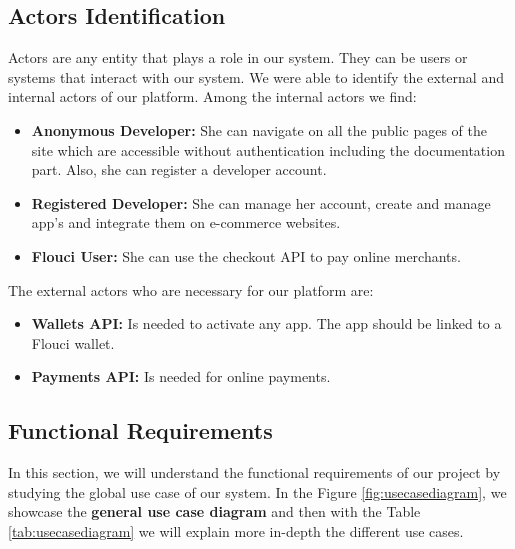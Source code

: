 \begin{spacing}{1.2}
\subsection{Actors Identification}
Actors are any entity that plays a role in our system. They can be users or systems that interact with our system. We were able to identify the external and internal actors of our platform.
\newline
Among the internal actors we find:
\begin{itemize}
  \item \textbf{Anonymous Developer:} She can navigate on all the public pages of the site which are
accessible without authentication including the documentation part. Also, she can register a developer account.
  \item \textbf{Registered Developer:} She can manage her account, create and manage app's and integrate them on e-commerce websites.
  \item \textbf{Flouci User:}  She can use the checkout API to pay online merchants.
\end{itemize}
The external actors who are necessary for our platform are:
\begin{itemize}
  \item \textbf{Wallets API:} Is needed to activate any app. The app should be linked to a Flouci wallet.
  \item \textbf{Payments API:} Is needed for online payments.
\end{itemize}
\subsection{Functional Requirements}
In this section, we will understand the functional requirements of our project by studying the global use case of our system.
	\newline In the Figure \ref{fig:usecasediagram}, we showcase the \textbf{general use case diagram} and then with the Table \ref{tab:usecasediagram} we will explain more in-depth the different use cases.


\end{spacing}
